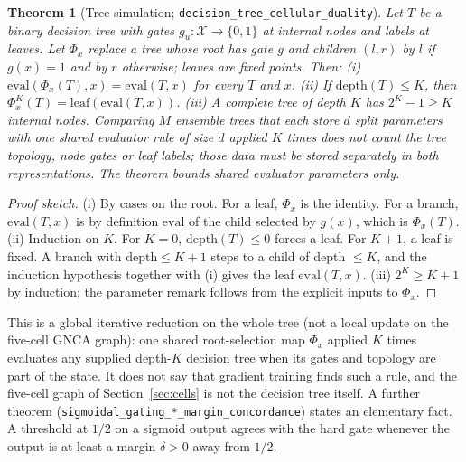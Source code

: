 \documentclass[10pt,twocolumn,letterpaper]{article}
\newtheorem{theorem}{Theorem}
\begin{document}
\begin{theorem}[Tree simulation; \texttt{decision\_\allowbreak{}tree\_\allowbreak{}cellular\_\allowbreak{}duality}]\label{thm:tree-nca-duality}
Let $T$ be a binary decision tree with gates $g_u:\mathcal{X}\to\{0,1\}$ at internal nodes and labels at leaves. Let $\Phi_x$ replace a tree whose root has gate $g$ and children $(l,r)$ by $l$ if $g(x)=1$ and by $r$ otherwise; leaves are fixed points. Then:
(i) $\mathrm{eval}(\Phi_x(T),x) = \mathrm{eval}(T,x)$ for every $T$ and $x$.
(ii) If $\mathrm{depth}(T)\le K$, then $\Phi_x^{K}(T) = \mathrm{leaf}(\mathrm{eval}(T,x))$.
(iii) A complete tree of depth $K$ has $2^K-1\ge K$ internal nodes. Comparing $M$ ensemble trees that each store $d$ split parameters with one shared evaluator rule of size $d$ applied $K$ times does \emph{not} count the tree topology, node gates or leaf labels; those data must be stored separately in both representations. The theorem bounds shared \emph{evaluator} parameters only.
\end{theorem}
\begin{proof}[Proof sketch]
(i) By cases on the root. For a leaf, $\Phi_x$ is the identity. For a branch, $\mathrm{eval}(T,x)$ is by definition $\mathrm{eval}$ of the child selected by $g(x)$, which is $\Phi_x(T)$. (ii) Induction on $K$. For $K{=}0$, $\mathrm{depth}(T)\le0$ forces a leaf. For $K{+}1$, a leaf is fixed. A branch with $\mathrm{depth}\le K{+}1$ steps to a child of depth $\le K$, and the induction hypothesis together with (i) gives the leaf $\mathrm{eval}(T,x)$. (iii) $2^K \ge K+1$ by induction; the parameter remark follows from the explicit inputs to $\Phi_x$.
\end{proof}
This is a global iterative reduction on the whole tree (not a local update on the five-cell GNCA graph): one shared root-selection map $\Phi_x$ applied $K$ times evaluates any supplied depth-$K$ decision tree when its gates and topology are part of the state. It does not say that gradient training finds such a rule, and the five-cell graph of Section~\ref{sec:cells} is not the decision tree itself. A further theorem (\texttt{sigmoidal\_\allowbreak{}gating\_\allowbreak{}*\_\allowbreak{}margin\_\allowbreak{}concordance}) states an elementary fact. A threshold at $1/2$ on a sigmoid output agrees with the hard gate whenever the output is at least a margin $\delta>0$ away from $1/2$.
\end{document}
